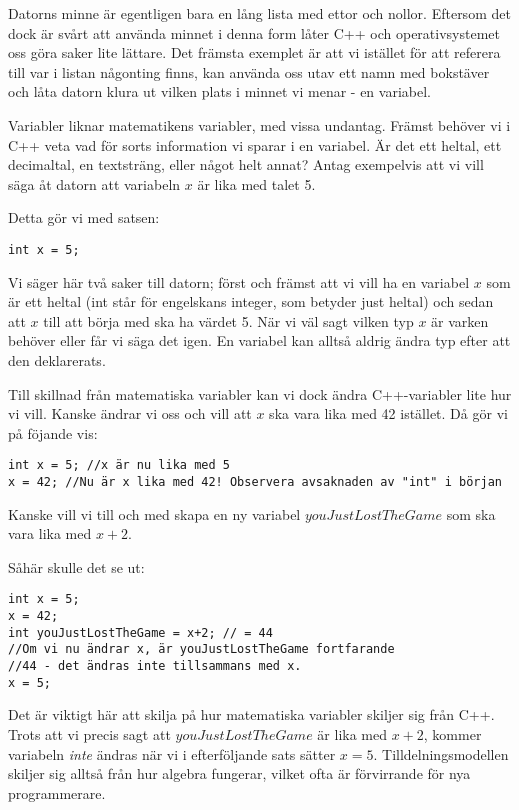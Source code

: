 Datorns minne är egentligen bara en lång lista med ettor och nollor. Eftersom det dock är svårt att använda minnet i denna form låter C++ och operativsystemet oss göra saker lite lättare. Det främsta exemplet är att vi istället för att referera till var i listan någonting finns, kan använda oss utav ett namn med bokstäver och låta datorn klura ut vilken plats i minnet vi menar - en variabel.

Variabler liknar matematikens variabler, med vissa undantag. Främst behöver vi i C++ veta vad för sorts information vi sparar i en variabel. Är det ett heltal, ett decimaltal, en textsträng, eller något helt annat? Antag exempelvis att vi vill säga åt datorn att variabeln $x$ är lika med talet 5.

Detta gör vi med satsen:
\begin{lstlisting}
int x = 5;
\end{lstlisting}

Vi säger här två saker till datorn; först och främst att vi vill ha en variabel $x$ som är ett heltal (int står för engelskans integer, som betyder just heltal) och sedan att $x$ till att börja med ska ha värdet 5. När vi väl sagt vilken typ $x$ är varken behöver eller får vi säga det igen. En variabel kan alltså aldrig ändra typ efter att den deklarerats.

Till skillnad från matematiska variabler kan vi dock ändra C++-variabler lite hur vi vill. Kanske ändrar vi oss och vill att $x$ ska vara lika med 42 istället. Då gör vi på föjande vis:

\begin{lstlisting}
int x = 5; //x är nu lika med 5
x = 42; //Nu är x lika med 42! Observera avsaknaden av "int" i början
\end{lstlisting}

Kanske vill vi till och med skapa en ny variabel $youJustLostTheGame$ som ska vara lika med $x+2$.

Såhär skulle det se ut:

\begin{lstlisting}
int x = 5;
x = 42;
int youJustLostTheGame = x+2; // = 44
//Om vi nu ändrar x, är youJustLostTheGame fortfarande
//44 - det ändras inte tillsammans med x.
x = 5;
\end{lstlisting}

Det är viktigt här att skilja på hur matematiska variabler skiljer sig från C++. Trots att vi precis sagt att $youJustLostTheGame$ är lika med $x+2$, kommer variabeln \emph{inte} ändras när vi i efterföljande sats sätter $x = 5$. Tilldelningsmodellen skiljer sig alltså från hur algebra fungerar, vilket ofta är förvirrande för nya programmerare.

